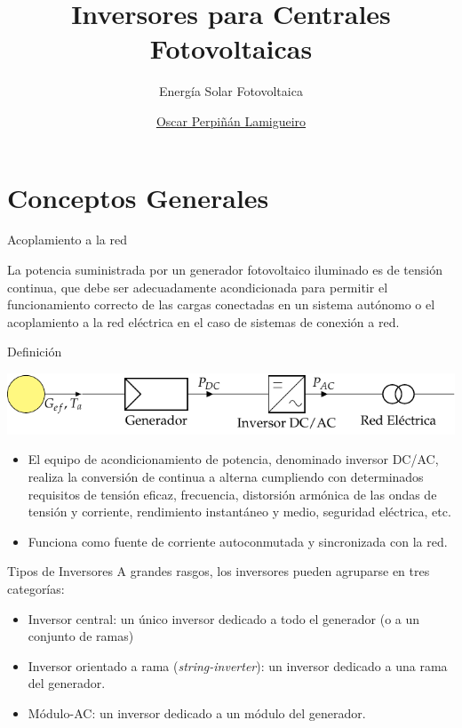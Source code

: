 \documentclass[aspectratio=169, usenames,svgnames,dvipsnames]{beamer}
\author{\href{https://oscarperpinan.github.io}{Oscar Perpiñán Lamigueiro}}
\date{}
\title{Inversores para Centrales Fotovoltaicas}
\subtitle{Energía Solar Fotovoltaica}
\institute[UPM]{Universidad Politécnica de Madrid}
\begin{document}
\maketitle
\section{Conceptos Generales}
\label{sec:org60d9976}
\begin{frame}[label={sec:org7e8879d}]{Acoplamiento a la red}
\begin{block}{}
La potencia suministrada por un generador fotovoltaico iluminado es de
tensión continua, que debe ser adecuadamente acondicionada para permitir
el funcionamiento correcto de las cargas conectadas en un sistema
autónomo o el acoplamiento a la red eléctrica en el caso de sistemas de
conexión a red.
\end{block}
\end{frame}
\begin{frame}[label={sec:org8fe08f3}]{Definición}
\begin{center}
\includegraphics[width=.9\linewidth]{../figs/SFCR_Esquema.pdf}
\end{center}


\begin{itemize}
\item El equipo de acondicionamiento de potencia, denominado inversor DC/AC, realiza la \alert{conversión de continua a alterna cumpliendo con  determinados requisitos} de tensión eficaz, frecuencia, distorsión armónica de las ondas de tensión y corriente, rendimiento instantáneo y medio, seguridad eléctrica, etc.

\item Funciona como fuente de corriente autoconmutada y sincronizada con la red.
\end{itemize}
\end{frame}
\begin{frame}[label={sec:org6198648}]{Tipos de Inversores}
A grandes rasgos, los inversores pueden agruparse en tres categorías:

\begin{itemize}
\item \alert{Inversor central}: un único inversor dedicado a todo el generador (o
a un conjunto de ramas)

\item \alert{Inversor orientado a rama} (\emph{string-inverter}): un inversor dedicado
a una rama del generador.

\item \alert{Módulo-AC}: un inversor dedicado a un módulo del generador.
\end{itemize}
\end{frame}
\end{document}
